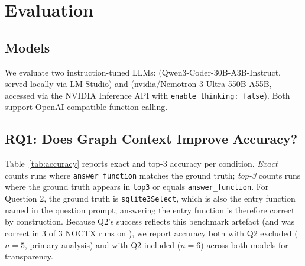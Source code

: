 \section{Evaluation}
\label{sec:eval}

\subsection{Models}

We evaluate two instruction-tuned LLMs: \qwen{} (Qwen3-Coder-30B-A3B-Instruct,
served locally via LM Studio) and \nemotron{} (nvidia/Nemotron-3-Ultra-550B-A55B,
accessed via the NVIDIA Inference API with \texttt{enable\_thinking: false}).
Both support OpenAI-compatible function calling.

\subsection{RQ1: Does Graph Context Improve Accuracy?}

Table~\ref{tab:accuracy} reports exact and top-3 accuracy per condition.
\emph{Exact} counts runs where \texttt{answer\_function} matches the ground truth;
\emph{top-3} counts runs where the ground truth appears in \texttt{top3} or equals \texttt{answer\_function}.
For Question 2, the ground truth is \texttt{sqlite3Select}, which is also the entry function named
in the question prompt; answering the entry function is therefore correct by construction.
Because Q2's success reflects this benchmark artefact (and was correct in 3 of 3 \textsc{NOCTX}
runs on \qwen), we report accuracy both with Q2 excluded ($n{=}5$, primary analysis) and with
Q2 included ($n{=}6$) across both models for transparency.

